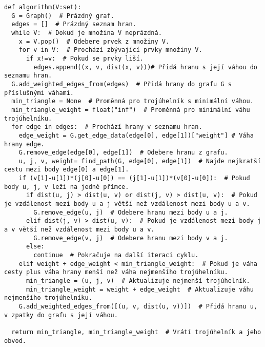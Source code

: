 \begin{mdframed}[style=MyFrame]
\begin{lstlisting}[style=metoo]
def algorithm(V:set):
  G = Graph()  # Prázdný graf.
  edges = []  # Prázdný seznam hran.
  while V:  # Dokud je množina V neprázdná.
    x = V.pop()  # Odebere prvek z množiny V.
    for v in V:  # Prochází zbývající prvky množiny V.
      if x!=v:  # Pokud se prvky liší.
        edges.append((x, v, dist(x, v)))# Přidá hranu s její váhou do seznamu hran.
  G.add_weighted_edges_from(edges)  # Přidá hrany do grafu G s příslušnými váhami.
  min_triangle = None  # Proměnná pro trojúhelník s minimální váhou.
  min_triangle_weight = float("inf")  # Proměnná pro minimální váhu trojúhelníku.
  for edge in edges:  # Prochází hrany v seznamu hran.
    edge_weight = G.get_edge_data(edge[0], edge[1])["weight"] # Váha hrany edge.
    G.remove_edge(edge[0], edge[1])  # Odebere hranu z grafu.
    u, j, v, weight= find_path(G, edge[0], edge[1])  # Najde nejkratší cestu mezi body edge[0] a edge[1].
    if (v[1]-u[1])*(j[0]-u[0]) == (j[1]-u[1])*(v[0]-u[0]):  # Pokud body u, j, v leží na jedné přímce.
      if dist(u, j) > dist(u, v) or dist(j, v) > dist(u, v):  # Pokud je vzdálenost mezi body u a j větší než vzdálenost mezi body u a v.
        G.remove_edge(u, j)  # Odebere hranu mezi body u a j.
      elif dist(j, v) > dist(u, v):  # Pokud je vzdálenost mezi body j a v větší než vzdálenost mezi body u a v.
        G.remove_edge(v, j)  # Odebere hranu mezi body v a j.
      else:
        continue  # Pokračuje na další iteraci cyklu.
    elif weight + edge_weight < min_triangle_weight:  # Pokud je váha cesty plus váha hrany menší než váha nejmenšího trojúhelníku.
      min_triangle = (u, j, v)  # Aktualizuje nejmenší trojúhelník.
      min_triangle_weight = weight + edge_weight  # Aktualizuje váhu nejmenšího trojúhelníku.
    G.add_weighted_edges_from([(u, v, dist(u, v))])  # Přidá hranu u, v zpatky do grafu s její váhou.

  return min_triangle, min_triangle_weight  # Vrátí trojúhelník a jeho obvod.
\end{lstlisting}
\end{mdframed}